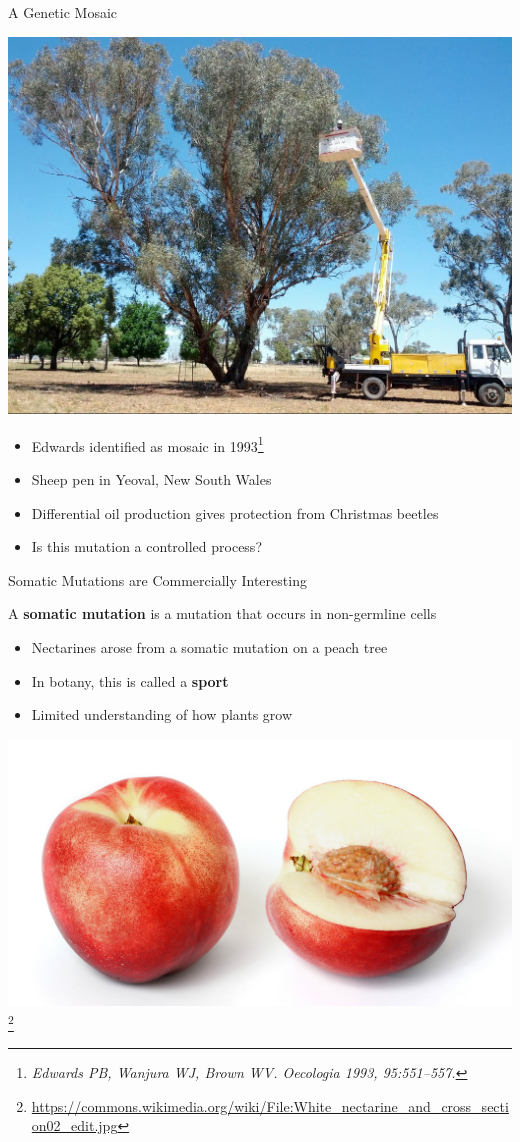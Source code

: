 \documentclass{beamer}
\begin{document}
\begin{frame}{A Genetic Mosaic}
	\begin{center}
	\includegraphics[width=.6\linewidth]{unlabeled_tree.jpg}
	\end{center}
	\begin{itemize}
		\item Edwards identified as mosaic in 1993\footnote{\textit{Edwards PB, Wanjura WJ, Brown WV. Oecologia 1993, 95:551–557.}}
		\item Sheep pen in Yeoval, New South Wales
		\item Differential oil production gives protection from Christmas beetles
		\item Is this mutation a controlled process?
	\end{itemize}
\end{frame}

\begin{frame}{Somatic Mutations are Commercially Interesting}
	\begin{definition}
		A \textbf{somatic mutation} is a mutation that occurs in non-germline cells	
	\end{definition}
	\begin{itemize}
		\item Nectarines arose from a somatic mutation on a peach tree %
		\item In botany, this is called a \textbf{sport}
		\item Limited understanding of how plants grow
	\end{itemize}
	\begin{center}
	\includegraphics[width=.6\linewidth]{nectarine.jpg}
	\footnote{\url{https://commons.wikimedia.org/wiki/File:White_nectarine_and_cross_section02_edit.jpg}}
	\end{center}
\end{frame}
\end{document}
